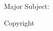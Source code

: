 \begin{titlepage}
\begin{tabular}{ll}
\end{tabular}

\vspace{3em}

\begin{center}
\tamugradmonth \hspace{2pt} \tamugradyear

\vspace{3em}

Major Subject: \tamudepartment \par
\vspace{3em}
Copyright \tamugradyear \hspace{.5em}\tamufullname
\par\end{center}
\end{titlepage}
\pagebreak{}